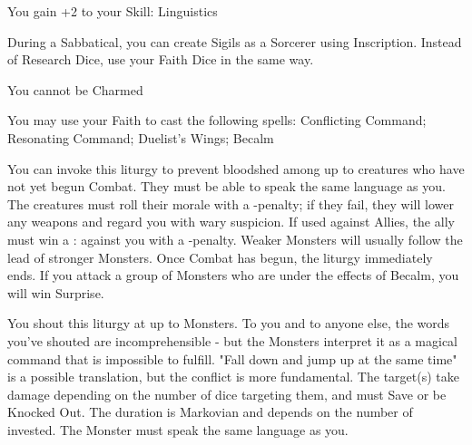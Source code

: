 {

You gain +2 to your Skill: Linguistics


During a Sabbatical, you can create Sigils as a Sorcerer using Inscription.  Instead of Research Dice, use your Faith Dice in the same way.  




\GOD[
Name=The Grey Lords,
Link=small-god-the grey lords,
GodOf=Archons of Diplomacy,
Holy=a choker of dove feathers
]


You cannot be Charmed


You may use your Faith to cast the following spells: Conflicting Command; Resonating Command; Duelist's Wings; Becalm

\LITURGY [
  Name= Becalm,
  Link= grey-lords-liturgy-becalm,
  Paradigm= Mind ,
  Save=  N ,
  Duration= Markovian ,
  Counter=  n/a  ,
  Keywords= Splittable ,
  Target=   Close or Nearby Monsters
]



You can invoke this liturgy to prevent bloodshed among up to \DICE creatures who have not yet begun Combat.  They must be able to speak the same language as you.  The creatures must roll their morale with a -\DICE penalty; if they fail, they will lower any weapons and regard you with wary suspicion.  If used against Allies, the ally must win a \RB : \FOC against you with a -\DICE penalty.  Weaker Monsters will usually follow the lead of stronger Monsters.  Once Combat has begun, the liturgy immediately ends.  If you attack a group of Monsters who are under the effects of Becalm, you will win Surprise.

\LITURGY [
  Name= Conflicting Command,
  Link=grey-lords-liturgy-conflicting command,
  Paradigm= Mind ,
  Save=  Y (negate Knocked Out effect) ,
  Duration= Markovian ,
  Counter=  n/a  ,
  Keywords= Splittable ,
  Target=   Close or Nearby Monsters
]



You shout this liturgy at up to \DICE Monsters.  To you and to anyone else, the words you've shouted are incomprehensible - but the Monsters interpret it as a magical command that is impossible to fulfill.  "Fall down and jump up at the same time" is a possible translation, but the conflict is more fundamental.  The target(s) take \DICE damage depending on the number of dice targeting them, and must Save or be Knocked Out.  The duration is Markovian and depends on the number of \DICE invested.  The Monster must speak the same language as you.

}
